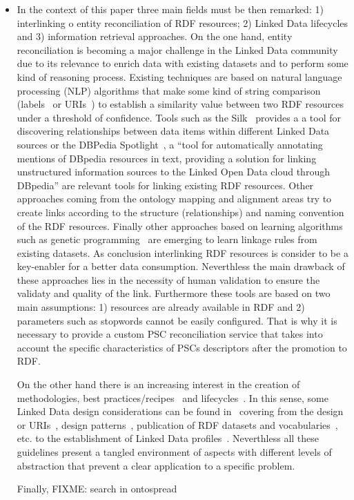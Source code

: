 \begin{itemize}
 \item In the context of this paper three main fields must be then remarked: 1) interlinking o entity reconciliation of 
 RDF resources; 2) Linked Data lifecycles and 3) information retrieval approaches. On the one hand, entity reconciliation is becoming a major challenge in the Linked Data community due to its relevance 
 to enrich data with existing datasets and to perform some kind of reasoning process. Existing techniques are based 
 on natural language processing (NLP) algorithms that make some kind of string comparison (labels~\cite{Serimi} or URIs~\cite{Maali_Cyganiak_2011}) 
 to establish a similarity value between two RDF resources under a threshold of confidence. Tools such as the Silk~\cite{DBLP:conf/semweb/JentzschIB10} provides a 
 a tool for discovering relationships between data items within different Linked Data sources or the DBPedia Spotlight~\cite{DBLP:conf/i-semantics/MendesJGB11}, a 
 ``tool for automatically annotating mentions of DBpedia resources in text, providing a solution for linking unstructured information sources to the Linked Open Data 
 cloud through DBpedia'' are relevant tools for linking existing RDF resources. Other approaches coming from the ontology mapping and alignment areas try to create 
 links according to the structure (relationships) and naming convention of the RDF resources. Finally other approaches based on learning algorithms such as 
 genetic programming~\cite{DBLP:conf/semweb/IseleB11} are emerging to learn linkage rules from existing datasets. As conclusion interlinking RDF resources is 
 consider to be a key-enabler for a better data consumption. Neverthless the main drawback of these approaches lies in the necessity of human validation 
 to ensure the validaty and quality of the link. Furthermore these tools are based on two main assumptions: 1) resources are already available in RDF and 
 2) parameters such as stopwords cannot be easily configured. That is why it is necessary to provide a custom PSC reconciliation service that takes into account 
 the specific characteristics of PSCs descriptors after the promotion to RDF.
 
 On the other hand there is an increasing interest in the creation of methodologies, best practices/recipes~\cite{best-gld,linked-data-cookbook} and lifecycles~\cite{gld-lifecycle,lod2-stack}. In this sense, some 
 Linked Data design considerations can be found in~\cite{bizer07how} covering from the design or URIs~\cite{Sauermann+2007a,bernerslee1998uri,uris-uk}, design patterns~\cite{linked-data-patterns}, 
 publication of RDF datasets and vocabularies~\cite{Berr08}, etc. to the establishment of Linked Data profiles~\cite{basic-profile-w3c}. Neverthless all these guidelines present 
 a tangled environment of aspects with different levels of abstraction that prevent a clear application to a specific problem.
 
 Finally, FIXME: search in ontospread

\end{itemize}


